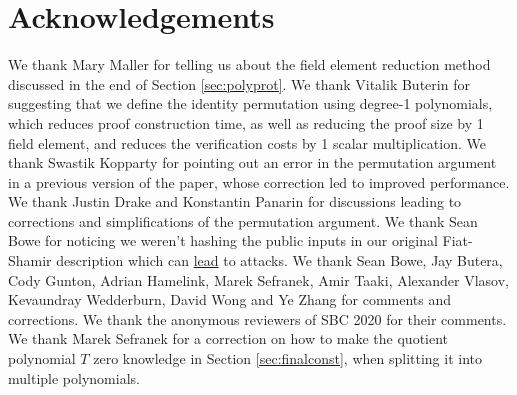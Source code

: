 \documentclass[11pt]{article} %
\newcommand{\chalpoint}{\ensuremath{\mathfrak{z}}\xspace}
\newcommand{\sigpolyevala}{\ensuremath{\mathsf{\bar{s}_{\sigma1}}}\xspace}
\newcommand{\sigpolyevalb}{\ensuremath{\mathsf{\bar{s}_{\sigma2}}}\xspace}
\newcommand{\sigcomma}{\ensuremath{[s_{\mathsf{\sigma1}}]_1}\xspace}
\newcommand{\sigcommb}{\ensuremath{[s_{\mathsf{\sigma2}}]_1}\xspace}
\begin{document}



 \section*{Acknowledgements} We thank Mary Maller for telling us about the field element reduction method discussed in the end of Section \ref{sec:polyprot}. We thank Vitalik Buterin for suggesting that we define the identity permutation using degree-1 polynomials, which reduces proof construction time, as well as reducing the proof size by 1 field element, and reduces the verification costs by 1 scalar multiplication. We thank Swastik Kopparty for pointing out an error in the permutation argument in a previous version of the paper, whose correction led to improved performance. We thank Justin Drake and Konstantin Panarin for discussions leading to corrections and simplifications of the permutation argument. We thank Sean Bowe for noticing we weren't hashing the public inputs in our original Fiat-Shamir description which can \href{https://blog.trailofbits.com/2022/04/18/the-frozen-heart-vulnerability-in-plonk/}{lead} to attacks. We thank Sean Bowe, Jay Butera, Cody Gunton, Adrian Hamelink, Marek Sefranek, Amir Taaki, Alexander Vlasov, Kevaundray Wedderburn, David Wong and Ye Zhang for comments and corrections. We thank the anonymous reviewers of SBC 2020 for their comments. We thank Marek Sefranek for a correction on how to make the quotient polynomial $T$ zero knowledge in Section \ref{sec:finalconst}, when splitting it into multiple polynomials.

    
\end{document}
